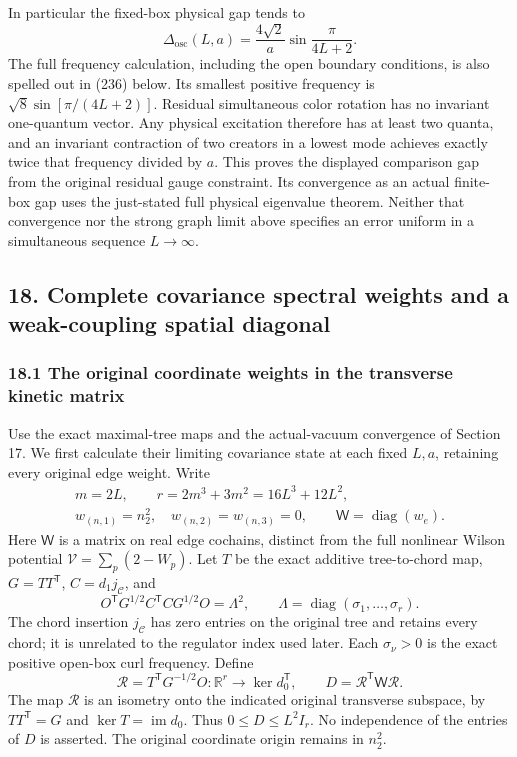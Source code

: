 \documentclass[
  11pt,
]{article}
\begin{document}
In particular the fixed-box physical gap tends to \[
 \Delta_{\mathrm{osc}}(L,a)=
     \frac{4\sqrt2}{a}\sin\frac{\pi}{4L+2}.
\] The full frequency calculation, including the open boundary
conditions, is also spelled out in (236) below. Its smallest positive
frequency is \(\sqrt8\sin[\pi/(4L+2)]\). Residual simultaneous color
rotation has no invariant one-quantum vector. Any physical excitation
therefore has at least two quanta, and an invariant contraction of two
creators in a lowest mode achieves exactly twice that frequency divided
by \(a\). This proves the displayed comparison gap from the original
residual gauge constraint. Its convergence as an actual finite-box gap
uses the just-stated full physical eigenvalue theorem. Neither that
convergence nor the strong graph limit above specifies an error uniform
in a simultaneous sequence \(L\to\infty\).

\subsection{18. Complete covariance spectral weights and a weak-coupling
spatial
diagonal}\label{complete-covariance-spectral-weights-and-a-weak-coupling-spatial-diagonal}

\subsubsection{18.1 The original coordinate weights in the transverse
kinetic
matrix}\label{the-original-coordinate-weights-in-the-transverse-kinetic-matrix}

Use the exact maximal-tree maps and the actual-vacuum convergence of
Section 17. We first calculate their limiting covariance state at each
fixed \(L,a\), retaining every original edge weight. Write \[
 \begin{gathered}
 m=2L,\qquad r=2m^3+3m^2=16L^3+12L^2,\\
 w_{(n,1)}=n_2^2,\quad w_{(n,2)}=w_{(n,3)}=0,\qquad
 \mathsf W=\operatorname{diag}(w_e).
 \end{gathered}
 \tag{221}
\] Here \(\mathsf W\) is a matrix on real edge cochains, distinct from
the full nonlinear Wilson potential \(\mathcal V=\sum_p(2-W_p)\). Let
\(T\) be the exact additive tree-to-chord map, \(G=TT^{\mathsf T}\),
\(C=d_1j_{\mathcal C}\), and \[
 O^{\mathsf T}G^{1/2}C^{\mathsf T}CG^{1/2}O=\Lambda^2,
 \qquad \Lambda=\operatorname{diag}(\sigma_1,\ldots,\sigma_r).
\] The chord insertion \(j_{\mathcal C}\) has zero entries on the
original tree and retains every chord; it is unrelated to the regulator
index used later. Each \(\sigma_\nu>0\) is the exact positive open-box
curl frequency. Define \[
 \mathscr R=T^{\mathsf T}G^{-1/2}O:
       \mathbb R^r\longrightarrow \ker d_0^{\mathsf T},
 \qquad D=\mathscr R^{\mathsf T}\mathsf W\mathscr R.
 \tag{222}
\] The map \(\mathscr R\) is an isometry onto the indicated original
transverse subspace, by \(TT^{\mathsf T}=G\) and
\(\ker T=\operatorname{im}d_0\). Thus \(0\le D\le L^2I_r\). No
independence of the entries of \(D\) is asserted. The original
coordinate origin remains in \(n_2^2\).
\end{document}
